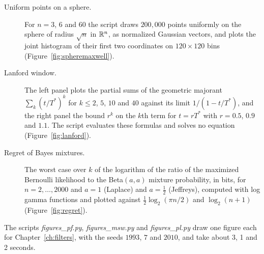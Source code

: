 \begin{description}
\item[Uniform points on a sphere.] For $n=3$, $6$ and $60$ the script draws $200{,}000$ points uniformly on the sphere of radius $\sqrt n$ in $\mathbb{R}^n$, as normalized Gaussian vectors, and plots the joint histogram of their first two coordinates on $120\times120$ bins (Figure~\ref{fig:spheremaxwell}).
\item[Lanford window.] The left panel plots the partial sums of the geometric majorant $\sum_k(t/T^*)^k$ for $k\le2$, $5$, $10$ and $40$ against its limit $1/(1-t/T^*)$, and the right panel the bound $r^k$ on the $k$th term for $t=rT^*$ with $r=0.5$, $0.9$ and $1.1$. The script evaluates these formulas and solves no equation (Figure~\ref{fig:lanford}).
\item[Regret of Bayes mixtures.] The worst case over $k$ of the logarithm of the ratio of the maximized Bernoulli likelihood to the Beta$(a,a)$ mixture probability, in bits, for $n=2,\dots,2000$ and $a=1$ (Laplace) and $a=\frac12$ (Jeffreys), computed with log gamma functions and plotted against $\frac12\log_2(\pi n/2)$ and $\log_2(n+1)$ (Figure~\ref{fig:regret}).
\end{description}

The scripts \textit{figures\_pf.py}, \textit{figures\_msw.py} and \textit{figures\_pl.py} draw one figure each for Chapter~\ref{ch:filters}, with the seeds $1993$, $7$ and $2010$, and take about 3, 1 and 2 seconds.

